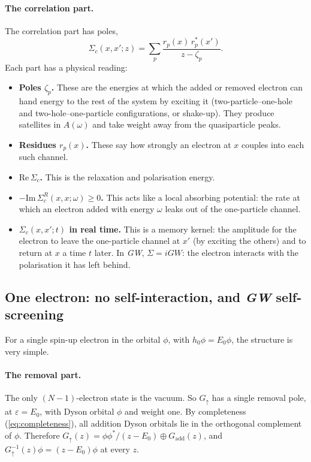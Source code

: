 \documentclass[11pt,a4paper]{article}
\newcommand{\GW}{\textit{GW}}
\newcommand{\up}{{\uparrow}}
\begin{document}
\paragraph{The correlation part.} The correlation part has poles,
\begin{equation}
\Sigma_c(x,x';z) = \sum_p \frac{r_p(x)\,r_p^*(x')}{z-\zeta_p}.
\label{eq:sigma-poles}
\end{equation}
Each part has a physical reading:
\begin{itemize}
\item \textbf{Poles $\zeta_p$.} These are the energies at which the added or removed electron can hand energy to the rest of the system by exciting it (two-particle--one-hole and two-hole--one-particle configurations, or shake-up). They produce satellites in $A(\omega)$ and take weight away from the quasiparticle peaks.
\item \textbf{Residues $r_p(x)$.} These say how strongly an electron at $x$ couples into each such channel.
\item \textbf{$\mathrm{Re}\,\Sigma_c$.} This is the relaxation and polarisation energy.
\item \textbf{$-\mathrm{Im}\,\Sigma_c^R(x,x;\omega)\ge0$.} This acts like a local absorbing potential: the rate at which an electron added with energy $\omega$ leaks out of the one-particle channel.
\item \textbf{$\Sigma_c(x,x';t)$ in real time.} This is a memory kernel: the amplitude for the electron to leave the one-particle channel at $x'$ (by exciting the others) and to return at $x$ a time $t$ later. In \GW{}, $\Sigma = iGW$: the electron interacts with the polarisation it has left behind.
\end{itemize}

\subsection{One electron: no self-interaction, and \GW{} self-screening}
\label{sec:one-electron}

For a single spin-up electron in the orbital $\phi$, with $\hat h_0\phi = E_0\phi$, the structure is very simple.

\paragraph{The removal part.} The only $(N-1)$-electron state is the vacuum. So $G_\up$ has a single removal pole, at $\varepsilon = E_0$, with Dyson orbital $\phi$ and weight one. By completeness (\cref{eq:completeness}), all addition Dyson orbitals lie in the orthogonal complement of $\phi$. Therefore $G_\up(z) = \phi\phi^*/(z-E_0) \oplus G_\text{add}(z)$, and $G_\up^{-1}(z)\phi = (z-E_0)\phi$ at every $z$.
\end{document}
